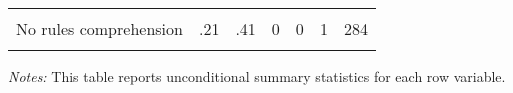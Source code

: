 \begin{table}[htbp]
{\begin{threeparttable}
\begin{tabular}{l*{6}{c}}
          &         &         &         &         &         &         \\
No rules comprehension&      .21&      .41&        0&        0&        1&      284\\
          &         &         &         &         &         &         \\
\bottomrule \end{tabular} \begin{tablenotes}[flushleft] \footnotesize \item \emph{Notes:} This table reports unconditional summary statistics for each row variable. \end{tablenotes} \end{threeparttable} } \end{table}

